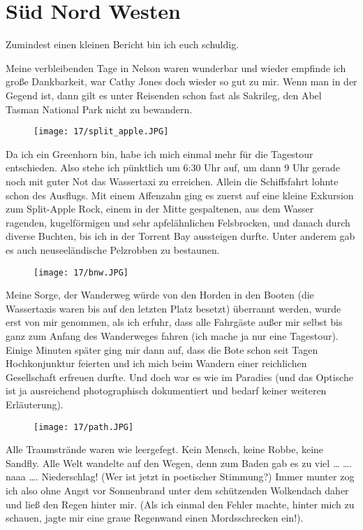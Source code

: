 \chapter{S\"ud Nord Westen}

Zumindest einen kleinen Bericht bin ich euch schuldig.

Meine verbleibenden Tage in Nelson waren wunderbar und wieder empfinde
ich große Dankbarkeit, war Cathy Jones doch wieder so gut zu mir. Wenn
man in der Gegend ist, dann gilt es unter Reisenden schon fast als
Sakrileg, den Abel Tasman National Park nicht zu bewandern.

\begin{figure}[h]
  \centering
  \texttt{[image: 17/split\_apple.JPG]}
\end{figure}
Da ich ein Greenhorn bin, habe ich mich einmal mehr für die Tagestour
entschieden.  Also stehe ich pünktlich um 6:30 Uhr auf, um dann 9 Uhr
gerade noch mit guter Not das Wassertaxi zu erreichen. Allein die
Schiffsfahrt lohnte schon des Ausflugs. Mit einem Affenzahn ging es
zuerst auf eine kleine Exkursion zum Split-Apple Rock, einem in der
Mitte gespaltenen, aus dem Wasser ragenden, kugelförmigen und sehr
apfelähnlichen Felsbrocken, und danach durch diverse Buchten, bis ich
in der Torrent Bay aussteigen durfte.  Unter anderem gab es auch
neuseeländische Pelzrobben zu bestaunen.

\begin{figure}[h]
  \centering
  \texttt{[image: 17/bnw.JPG]}
\end{figure}
Meine Sorge, der Wanderweg würde von den Horden in den
Booten (die Wassertaxis waren bis auf den letzten Platz besetzt)
überrannt werden, wurde erst von mir genommen, als ich erfuhr, dass
alle Fahrgäste außer mir selbst bis ganz zum Anfang des Wanderweges
fahren (ich mache ja nur eine Tagestour). Einige Minuten später ging
mir dann auf, dass die Bote schon seit Tagen Hochkonjunktur feierten
und ich mich beim Wandern einer reichlichen Gesellschaft erfreuen
durfte. Und doch war es wie im Paradies (und das Optische ist ja
ausreichend photographisch dokumentiert und bedarf keiner weiteren
Erläuterung).

\begin{figure}[h]
  \centering
  \texttt{[image: 17/path.JPG]}
\end{figure}
Alle Traumstrände waren wie leergefegt. Kein Mensch, keine Robbe,
keine Sandfly. Alle Welt wandelte auf den Wegen, denn zum Baden gab es
zu viel \ldots{} \ldots.  naaa \ldots. Niederschlag! (Wer ist jetzt in
poetischer Stimmung?) Immer munter zog ich also ohne Angst vor
Sonnenbrand unter dem schützenden Wolkendach daher und ließ den Regen
hinter mir. (Als ich einmal den Fehler machte, hinter mich zu schauen,
jagte mir eine graue Regenwand einen Mordsschrecken ein!).

